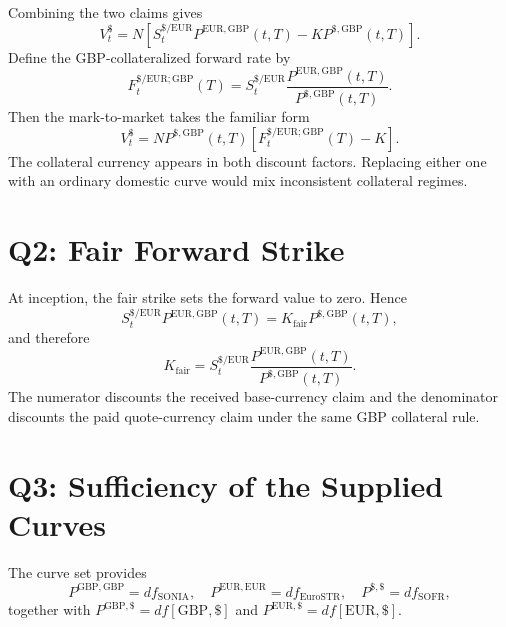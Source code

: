 \documentclass[11pt]{article}
\numberwithin{equation}{section}
\begin{document}
Combining the two claims gives
\begin{equation}
\boxed{
V_t^{\$}=N\left[
S_t^{\$/\mathrm{EUR}}P^{\mathrm{EUR},\mathrm{GBP}}(t,T)
-KP^{\$,\mathrm{GBP}}(t,T)
\right].}
\end{equation}
Define the GBP-collateralized forward rate by
\begin{equation}
F_t^{\$/\mathrm{EUR};\mathrm{GBP}}(T)
=S_t^{\$/\mathrm{EUR}}
\frac{P^{\mathrm{EUR},\mathrm{GBP}}(t,T)}
{P^{\$,\mathrm{GBP}}(t,T)}.
\end{equation}
Then the mark-to-market takes the familiar form
\begin{equation}
\boxed{V_t^{\$}=NP^{\$,\mathrm{GBP}}(t,T)
\left[F_t^{\$/\mathrm{EUR};\mathrm{GBP}}(T)-K\right].}
\end{equation}
The collateral currency appears in both discount factors. Replacing either
one with an ordinary domestic curve would mix inconsistent collateral regimes.

\section{Q2: Fair Forward Strike}
At inception, the fair strike sets the forward value to zero. Hence
\begin{equation}
S_t^{\$/\mathrm{EUR}}P^{\mathrm{EUR},\mathrm{GBP}}(t,T)
=K_{\mathrm{fair}}P^{\$,\mathrm{GBP}}(t,T),
\end{equation}
and therefore
\begin{equation}
\boxed{
K_{\mathrm{fair}}
=S_t^{\$/\mathrm{EUR}}
\frac{P^{\mathrm{EUR},\mathrm{GBP}}(t,T)}
{P^{\$,\mathrm{GBP}}(t,T)}.}
\end{equation}
The numerator discounts the received base-currency claim and the denominator
discounts the paid quote-currency claim under the same GBP collateral rule.

\section{Q3: Sufficiency of the Supplied Curves}
The curve set provides
\begin{equation}
P^{\mathrm{GBP},\mathrm{GBP}}=df_{\mathrm{SONIA}},\quad
P^{\mathrm{EUR},\mathrm{EUR}}=df_{\mathrm{EuroSTR}},\quad
P^{\$,\$}=df_{\mathrm{SOFR}},
\end{equation}
together with $P^{\mathrm{GBP},\$}=df[\mathrm{GBP},\$]$ and
$P^{\mathrm{EUR},\$}=df[\mathrm{EUR},\$]$.
\end{document}
